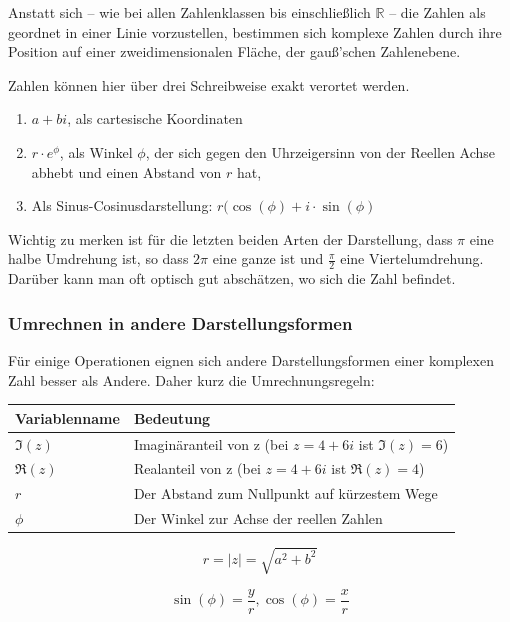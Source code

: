 \documentclass{scrartcl}
\begin{document}
Anstatt sich -- wie bei allen Zahlenklassen bis einschließlich $\mathbb{R}$ -- die Zahlen als geordnet in einer Linie vorzustellen,
bestimmen sich komplexe Zahlen durch ihre Position auf einer zweidimensionalen Fläche, der gauß'schen Zahlenebene.

Zahlen können hier über drei Schreibweise exakt verortet werden.

\begin{enumerate}
	\item $a + bi$, als cartesische Koordinaten
	\item $r \cdot e^\phi$, als Winkel $\phi$, der sich gegen den Uhrzeigersinn von der Reellen Achse abhebt und einen Abstand
		von $r$ hat,
	\item Als Sinus-Cosinusdarstellung: $r (\cos(\phi) + i\cdot\sin(\phi)$
\end{enumerate}

Wichtig zu merken ist für die letzten beiden Arten der Darstellung, dass $\pi$ eine halbe Umdrehung ist, so dass $2\pi$ eine ganze ist
und $\frac{\pi}{2}$ eine Viertelumdrehung. Darüber kann man oft optisch gut abschätzen, wo sich die Zahl befindet.

\subsubsection{Umrechnen in andere Darstellungsformen}

Für einige Operationen eignen sich andere Darstellungsformen einer komplexen Zahl besser als Andere. Daher kurz die Umrechnungsregeln:

\begin{tabular}{|l|l|}
	Variablenname & Bedeutung\\ \hline
	$\Im(z)$ & Imaginäranteil von z (bei $z = 4 + 6i$ ist $\Im(z) = 6$) \\
	$\Re(z)$ & Realanteil von z (bei $z = 4 + 6i$ ist $\Re(z) = 4$) \\
	$r$ & Der Abstand zum Nullpunkt auf kürzestem Wege \\
	$\phi$ & Der Winkel zur Achse der reellen Zahlen\\
\end{tabular}

\begin{equation}
	r = |z| = \sqrt{a^2 + b^2}
\end{equation}

\begin{equation}
	\sin(\phi) = \frac{y}{r}, 
	\cos(\phi) = \frac{x}{r}
\end{equation}
\end{document}

